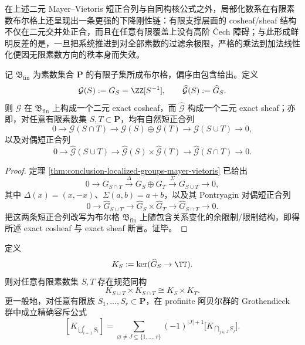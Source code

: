 在上述二元 Mayer--Vietoris 短正合列与自同构核公式之外，局部化数系在有限素数布尔格上还呈现出一条更强的下降刚性链：有限支撑层面的 cosheaf/sheaf 结构不仅在二元交并处正合，而且在任意有限覆盖上没有高阶 \v Cech 障碍；与此形成鲜明反差的是，一旦把系统推进到对全部素数的过滤余极限，严格的乘法到加法线性化便因无限素数方向的秩本身而失效。

\begin{theorem}\label{thm:conclusion-localized-exact-cosheaf-sheaf-boolean-lattice}
记 \(\mathfrak B_{\mathrm{fin}}\) 为素数集合 \(\mathbf P\) 的有限子集所成布尔格，偏序由包含给出。定义
\[
\mathcal G(S):=G_S=\ZZ[S^{-1}],
\qquad
\widehat{\mathcal G}(S):=\widehat G_S.
\]
则 \(\mathcal G\) 在 \(\mathfrak B_{\mathrm{fin}}\) 上构成一个二元 exact cosheaf，而 \(\widehat{\mathcal G}\) 构成一个二元 exact sheaf；亦即，对任意有限素数集 \(S,T\subset \mathbf P\)，均有自然短正合列
\[
0\longrightarrow \mathcal G(S\cap T)
\longrightarrow \mathcal G(S)\oplus \mathcal G(T)
\longrightarrow \mathcal G(S\cup T)
\longrightarrow 0,
\]
以及对偶短正合列
\[
0\longrightarrow \widehat{\mathcal G}(S\cup T)
\longrightarrow \widehat{\mathcal G}(S)\times \widehat{\mathcal G}(T)
\longrightarrow \widehat{\mathcal G}(S\cap T)
\longrightarrow 0.
\]
\end{theorem}

\begin{proof}
定理 \ref{thm:conclusion-localized-groups-mayer-vietoris} 已给出
\[
0\longrightarrow G_{S\cap T}
\overset{\Delta}{\longrightarrow}
G_S\oplus G_T
\overset{\Sigma}{\longrightarrow}
G_{S\cup T}
\longrightarrow 0,
\]
其中 \(\Delta(x)=(x,-x)\)、\(\Sigma(a,b)=a+b\)，以及其 Pontryagin 对偶短正合列
\[
0\longrightarrow \widehat G_{S\cup T}
\longrightarrow \widehat G_S\times \widehat G_T
\longrightarrow \widehat G_{S\cap T}
\longrightarrow 0.
\]
把这两条短正合列改写为布尔格 \(\mathfrak B_{\mathrm{fin}}\) 上随包含关系变化的余限制/限制结构，即得所述 exact cosheaf 与 exact sheaf 断言。证毕。
\end{proof}

\begin{theorem}\label{thm:conclusion-localized-kernel-inclusion-exclusion-mobius}
定义
\[
K_S:=\ker(\widehat G_S\to \TT).
\]
则对任意有限素数集 \(S,T\) 存在规范同构
\[
K_{S\cup T}\times K_{S\cap T}\cong K_S\times K_T.
\]
更一般地，对任意有限族 \(S_1,\dots,S_r\subset \mathbf P\)，在 profinite 阿贝尔群的 Grothendieck 群中成立精确容斥公式
\[
[K_{\bigcup_{i=1}^r S_i}]
=
\sum_{\varnothing\neq J\subseteq \{1,\dots,r\}}
(-1)^{|J|+1}
\bigl[K_{\bigcap_{j\in J} S_j}\bigr].
\]
\end{theorem}

